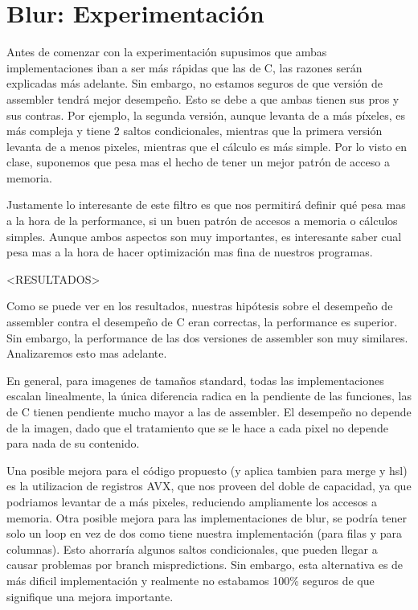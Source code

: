 \section*{Blur: Experimentación}

Antes de comenzar con la experimentación supusimos que ambas implementaciones iban a ser más rápidas que las de C, las razones serán explicadas más adelante. Sin embargo, no estamos seguros de que versión de assembler tendrá mejor desempeño.
Esto se debe a que ambas tienen sus pros y sus contras. Por ejemplo, la segunda versión, aunque levanta de a más píxeles, es más compleja y tiene 2 saltos condicionales, mientras que la primera versión levanta de a menos pixeles, mientras que el cálculo es más simple. Por lo visto en clase, suponemos que pesa mas el hecho de tener un mejor patrón de acceso a memoria.

Justamente lo interesante de este filtro es que nos permitirá definir qué pesa mas a la hora de la performance, si un buen patrón de accesos a memoria o cálculos simples. Aunque ambos aspectos son muy importantes, es interesante saber cual pesa mas a la hora de hacer optimización mas fina de nuestros programas.


<RESULTADOS>


Como se puede ver en los resultados, nuestras hipótesis sobre el desempeño de assembler contra el desempeño de C eran correctas, la performance es superior. Sin embargo, la performance de las dos versiones de assembler son muy similares. Analizaremos esto mas adelante.


En general, para imagenes de tamaños standard, todas las implementaciones escalan linealmente, la única diferencia radica en la pendiente de las funciones, las de C tienen pendiente mucho mayor a las de assembler. El desempeño no depende de la imagen, dado que el tratamiento que se le hace a cada pixel no depende para nada de su contenido.

Una posible mejora para el código propuesto (y aplica tambien para merge y hsl) es la utilizacion de registros AVX, que nos proveen del doble de capacidad, ya que podriamos levantar de a más pixeles, reduciendo ampliamente los accesos a memoria.
Otra posible mejora para las implementaciones de blur, se podría tener solo un loop en vez de dos como tiene nuestra implementación (para filas y para columnas). Esto ahorraría algunos saltos condicionales, que pueden llegar a causar problemas por branch mispredictions.
Sin embargo, esta alternativa es de más dificil implementación y realmente no estabamos 100\% seguros de que signifique una mejora importante.

